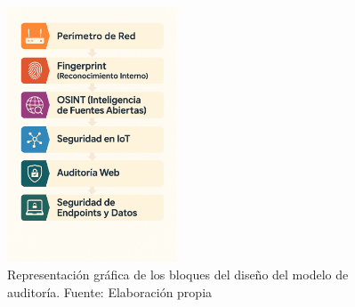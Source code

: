 \documentclass[a4paper, 10pt]{article}
\begin{document}
\begin{figure}[H]
    \centering
    \includegraphics[width=0.45\textwidth]{images/diseno.png}
    \caption{Representación gráfica de los bloques del diseño del modelo de auditoría. Fuente: Elaboración propia}
    \label{fig:diseno_modelo_auditoria}
\end{figure}
\end{document}
